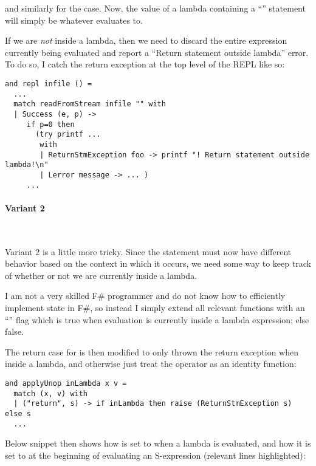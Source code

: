 and similarly for the  case. Now, the value of a lambda containing a
``'' statement will simply be whatever  evaluates to.

\bigskip

If we are \emph{not} inside a lambda, then we need to discard the entire
expression currently being evaluated and report a ``Return statement outside
lambda'' error. To do so, I catch the return exception at the top level of the
REPL like so:

\begin{verbatim}
and repl infile () =
  ...
  match readFromStream infile "" with
  | Success (e, p) ->
     if p=0 then
       (try printf ...
        with
        | ReturnStmException foo -> printf "! Return statement outside lambda!\n"
        | Lerror message -> ... )
     ...
\end{verbatim}

\paragraph{Variant 2}~\smallskip

Variant 2 is a little more tricky. Since the  statement must now have
different behavior based on the context in which it occurs, we need some way to
keep track of whether or not we are currently inside a lambda.

\smallskip

I am not a very skilled F\# programmer and do not know how to efficiently
implement state in F\#, so instead I simply extend all relevant functions with
an ``'' flag which is true when evaluation is currently inside a
lambda expression; else false.

\medskip

The return case for  is then modified to only thrown the return
exception when inside a lambda, and otherwise just treat the 
operator as an identity function:

\begin{verbatim}
and applyUnop inLambda x v =
  match (x, v) with
  | ("return", s) -> if inLambda then raise (ReturnStmException s) else s
  ...
\end{verbatim}

Below snippet then shows how  is set to  when a lambda is
evaluated, and how it is set to  at the beginning of evaluating an
S-expression (relevant lines highlighted):

